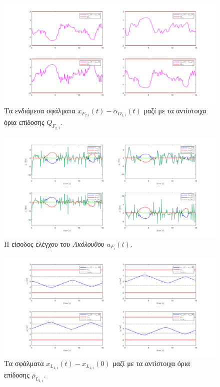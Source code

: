 \begin{figure}[H]
    \centering
    \includegraphics[width=1\linewidth]{Chapters/Chapter3/Figures/Sim3Fig5.png}
    \caption{Τα ενδιάμεσα σφάλματα $x_{F_{2,i}}(t) - \alpha_{O_{1,i}}(t)$ μαζί με τα αντίστοιχα όρια επίδοσης $Q_{F_{2,i}}$.}
    \label{Sim3Fig5}
\end{figure}



\begin{figure}[H]
    \centering
    \includegraphics[width=1\linewidth]{Chapters/Chapter3/Figures/Sim3Fig6.png}
    \caption{Η είσοδος ελέγχου του \textit{Ακόλουθου} $u_{F_{i}}(t)$.}
    \label{Sim3Fig6}
\end{figure}

\begin{figure}[H]
    \centering
    \includegraphics[width=1\linewidth]{Chapters/Chapter3/Figures/Sim3Fig7.png}
    \caption{Τα σφάλματα $x_{L_{1,i}}(t) - x_{L_{1,i}}(0)$ μαζί με τα αντίστοιχα όρια επίδοσης $\rho_{L_{1,i}}$.}
    \label{Sim3Fig7}
\end{figure}



